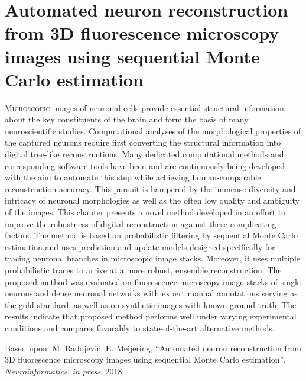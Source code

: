 %
%
\chpos{15mm}{8mm}
\chapter[Automated neuron reconstruction from 3D fluorescence microscopy images using sequential Monte Carlo estimation]{Automated neuron reconstruction from 3D fluorescence microscopy images using sequential Monte Carlo estimation}
\label{ch4:pnr}
{\small \lettrine{M}{icroscopic} images of neuronal cells provide essential structural information about the key constituents of the brain and form the basis of many neuroscientific studies. Computational analyses of the morphological properties of the captured neurons require first converting the structural information into digital tree-like reconstructions. Many dedicated computational methods and corresponding software tools have been and are continuously being developed with the aim to automate this step while achieving human-comparable reconstruction accuracy. This pursuit is hampered by the immense diversity and intricacy of neuronal morphologies as well as the often low quality and ambiguity of the images. This chapter presents a novel method developed in an effort to improve the robustness of digital reconstruction against these complicating factors. The method is based on probabilistic filtering by sequential Monte Carlo estimation and uses prediction and update models designed specifically for tracing neuronal branches in microscopic image stacks. Moreover, it uses multiple probabilistic traces to arrive at a more robust, ensemble reconstruction. The proposed method was evaluated on fluorescence microscopy image stacks of single neurons and dense neuronal networks with expert manual annotations serving as the gold standard, as well as on synthetic images with known ground truth. The results indicate that proposed method performs well under varying experimental conditions and compares favorably to state-of-the-art alternative methods.\par}
\vspace*{9em}
\begin{publish}
	Based upon: M. Radojevi\'{c}, E. Meijering, ``Automated neuron reconstruction from 3D fluorescence microscopy images using sequential Monte Carlo estimation'', \textit{Neuroinformatics}, \textit{in press}, 2018.%
\end{publish}

